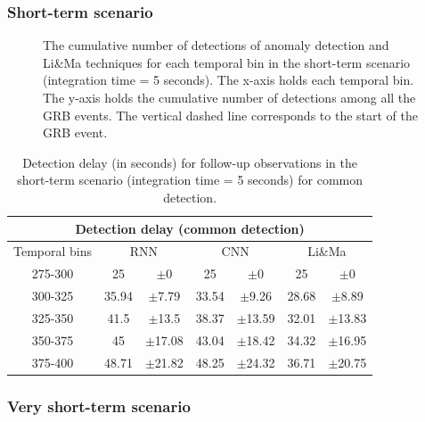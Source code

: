 \FloatBarrier
\subsubsection{Short-term scenario}
\label{s:Follow-Up-Observation-Results-Short-Term}



\begin{figure}[!ht]
\centering

\captionsetup{width=1\linewidth}
\caption{The cumulative number of detections of anomaly detection and Li\&Ma techniques for each temporal bin in the short-term scenario (integration time = 5 seconds). The x-axis holds each temporal bin. The y-axis holds the cumulative number of detections among all the GRB events. The vertical dashed line corresponds to the start of the GRB event.}
\label{f:follow-up-itime-5}
\end{figure}


\begin{table}[!ht]
\centering
\begin{tabular}{|c|cc|cc|cc|} 
\hline
\multicolumn{7}{|c|}{\textbf{Detection delay} (common detection)} \\ 
\hline
\multicolumn{1}{|c|}{Temporal bins} & \multicolumn{2}{c|}{RNN} & \multicolumn{2}{c|}{CNN} & \multicolumn{2}{c|}{Li\&Ma} \\ 
\hline
275-300 &  25    & $\pm$0 & 25 &  $\pm$0 & 25 &  $\pm$0  \\
300-325 & 35.94 & $\pm$7.79 & 33.54 &  $\pm$9.26 & 28.68 &  $\pm$8.89 \\
325-350 & 41.5  & $\pm$13.5 & 38.37 & $\pm$13.59 & 32.01 & $\pm$13.83 \\
350-375 & 45    & $\pm$17.08 & 43.04 & $\pm$18.42 & 34.32 & $\pm$16.95  \\
375-400 & 48.71 & $\pm$21.82 & 48.25 & $\pm$24.32 & 36.71 & $\pm$20.75  \\
\hline
\end{tabular}
\caption{Detection delay (in seconds) for follow-up observations in the short-term scenario (integration time = 5 seconds) for common detection.}
\label{tab:dd-follow-up-itime-5-common}
\end{table}
 

\FloatBarrier
\subsubsection{Very short-term scenario}
\label{s:Follow-Up-Observation-Results-Very-Short-Term}

